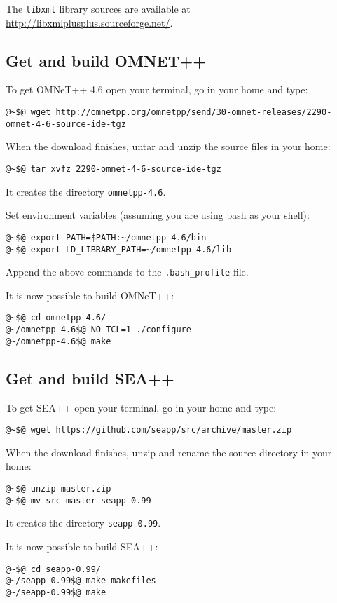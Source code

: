 The \texttt{libxml} library sources are available at \url{http://libxmlplusplus.sourceforge.net/}.



\subsection{Get and build OMNET++}
To get OMNeT++ 4.6 open your terminal, go in your home and type:
%
\begin{lstlisting}[language={terminal}]
@~$@ wget http://omnetpp.org/omnetpp/send/30-omnet-releases/2290-omnet-4-6-source-ide-tgz
\end{lstlisting}
%
When the download finishes, untar and unzip the source files in your home:
%
\begin{lstlisting}[language={terminal}]
@~$@ tar xvfz 2290-omnet-4-6-source-ide-tgz
\end{lstlisting}
%
It creates the directory \texttt{omnetpp-4.6}.

Set environment variables (assuming you are using bash as your shell):
%
\begin{lstlisting}[language={terminal}]
@~$@ export PATH=$PATH:~/omnetpp-4.6/bin
@~$@ export LD_LIBRARY_PATH=~/omnetpp-4.6/lib
\end{lstlisting}
%
Append the above commands to the \texttt{.bash\_profile} file.

It is now possible to build OMNeT++:
%
\begin{lstlisting}[language={terminal}]
@~$@ cd omnetpp-4.6/
@~/omnetpp-4.6$@ NO_TCL=1 ./configure
@~/omnetpp-4.6$@ make
\end{lstlisting}



\subsection{Get and build SEA++}
To get SEA++ open your terminal, go in your home and type:
%
\begin{lstlisting}[language={terminal}]
@~$@ wget https://github.com/seapp/src/archive/master.zip
\end{lstlisting}
%
When the download finishes, unzip and rename the source directory in your home:
%
\begin{lstlisting}[language={terminal}]
@~$@ unzip master.zip
@~$@ mv src-master seapp-0.99
\end{lstlisting}
%
It creates the directory \texttt{seapp-0.99}.

It is now possible to build SEA++:
%
\begin{lstlisting}[language={terminal}]
@~$@ cd seapp-0.99/
@~/seapp-0.99$@ make makefiles
@~/seapp-0.99$@ make
\end{lstlisting}

